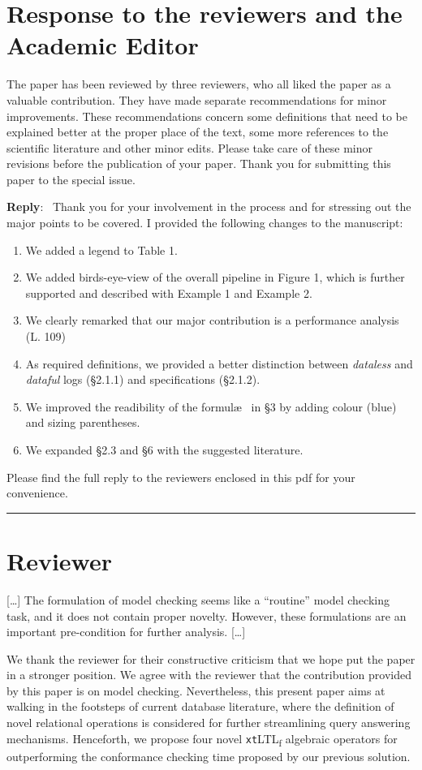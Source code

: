 \documentclass{article}
\newcounter{mycomment}
\newenvironment{UnknownEnvironment}
 {\unskip\stepcounter{mycomment}\zsavepos{endpar\the\value{mycomment}}%
    \par\bigskip%
    \begin{adjustwidth}{3cm}{0cm}\begin{sf}}
 {\end{sf}\end{adjustwidth}
  \par\bigskip
  \noindent\hspace*{\dimexpr\zposx{endpar\the\value{mycomment}}sp-\oddsidemargin-1in}\ignorespaces}
\newcounter{reviewer}
\newcounter{point}[reviewer]
\newcommand{\reviewersection}{\stepcounter{reviewer} \bigskip \hrule
                  \section*{Reviewer \thereviewer}}
\newenvironment{reply}
   {\medskip \noindent \begin{sf}\textbf{Reply}:\  }
   {\medskip \end{sf}}
\begin{document}
\section*{Response to the reviewers and the Academic Editor}

The paper has been reviewed by three reviewers, who all liked the paper as a valuable contribution. They have made separate recommendations for minor improvements. These recommendations concern some definitions that need to be explained better at the proper place of the text, some more references to the scientific literature and other minor edits. Please take care of these minor revisions before the publication of your paper. Thank you for submitting this paper to the special issue. 


\begin{reply}
Thank you for your involvement in the process and for stressing out the major points to be covered. I provided the following changes to the manuscript:
\begin{enumerate}
\item We added a legend to Table 1.
\item We added birds-eye-view of the overall pipeline in Figure 1, which is further supported and described with Example 1 and Example 2.
\item We clearly remarked that our major contribution is a performance analysis (L. 109)
\item  As required definitions, we provided a better distinction between \textit{dataless} and \textit{dataful} logs (\S2.1.1) and specifications (\S2.1.2).
\item We improved the readibility of the formul\ae~ in \S3 by adding colour (blue) and sizing parentheses.
\item We expanded \S2.3 and \S6 with the suggested literature. 
\end{enumerate}
Please find the full reply to the reviewers enclosed in this pdf for your convenience. 
\end{reply}



\newpage
\reviewersection
[\dots]  The formulation of model checking seems like a “routine” model checking task, and it does not contain proper novelty.  However, these formulations are an important pre-condition for further analysis. [\dots]
\begin{UnknownEnvironment}
We thank the reviewer for their constructive criticism that we hope put the paper in a stronger position. We agree with the reviewer that the contribution provided by this paper is on model checking. Nevertheless, this present paper aims at walking in the footsteps of current database literature, where the definition of novel relational operations is considered for further streamlining query answering mechanisms. Henceforth, we propose four novel \texttt{xt}LTL\textsubscript{f} algebraic operators for outperforming the conformance checking time proposed by our previous solution.
\end{UnknownEnvironment}
\end{document}
